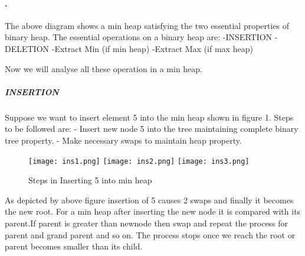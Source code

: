 \documentclass{amsart}
\theoremstyle{plain}
\numberwithin{equation}{section}
\begin{document}
\paragraph{.}
The above diagram shows a min heap satisfying the two essential properties of binary heap.\newline
The essential operations on a binary heap are:\newline
\indent -INSERTION\newline
\indent -DELETION \newline
\indent\indent -Extract Min (if min heap)\newline
\indent\indent -Extract Max (if max heap)\newline 

Now we will analyse all these operation in a min heap.\newline\newline
\subparagraph{\textbf{INSERTION}\newline}
Suppose we want to insert element 5 into the min heap shown in figure 1.\newline
Steps to be followed are:\newline
\indent - Insert new node 5 into the tree maintaining complete binary tree property.\newline
\indent - Make necessary swaps to maintain heap property.\newline

\begin{figure}[h] \label{fig:png}
	\texttt{[image: ins1.png]} \hspace{0.5in}
	\texttt{[image: ins2.png]} \hspace{0.5in}
	\texttt{[image: ins3.png]} \hspace{0.5in}  
	\caption{Steps in Inserting 5 into min heap}	
\end{figure}

As depicted by above figure insertion of 5 causes 2 swaps and finally it becomes the new root.\newline
For a min heap after inserting the new node it is compared with its parent.If parent is greater than newnode then swap and repeat the process for parent and grand parent and so on. The process stops once we reach the root or parent becomes smaller than its child.\newline
\end{document}
